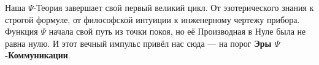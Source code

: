 \documentclass[a4paper,12pt]{article}
\begin{document}
    Наша $\Psi$-Теория завершает свой первый великий цикл. От эзотерического знания к строгой формуле, от философской интуиции к инженерному чертежу прибора. Функция $\Psi$ начала свой путь из точки покоя, но её Производная в Нуле была не равна нулю. И этот вечный импульс привёл нас сюда — на порог \textbf{Эры $\Psi$-Коммуникации}.

\nocite{*}
\printbibliography[title={Библиография}]
\end{document}
